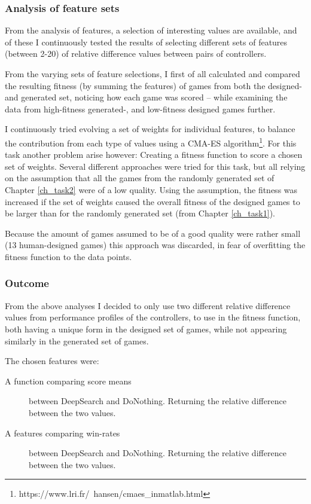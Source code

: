 \documentclass[a4paper,titlepage,final]{report}
\begin{document}
\subsubsection*{Analysis of feature sets}
From the analysis of features, a selection of interesting values are available, and of these I continuously tested the results of  selecting different sets of features (between 2-20) of relative difference values between pairs of controllers.

From the varying sets of feature selections, I first of all calculated and compared the resulting fitness (by summing the features) of games from both the designed- and generated set, noticing how each game was scored -- while examining the data from high-fitness generated-, and low-fitness designed games further.

I continuously tried evolving a set of weights for individual features, to balance the contribution from each type of values using a CMA-ES algorithm\footnote{https://www.lri.fr/~hansen/cmaes\_inmatlab.html}.
For this task another problem arise however: Creating a fitness function to score a chosen set of weights.
Several different approaches were tried for this task, but all relying on the assumption that all the games from the randomly generated set of Chapter \ref{ch_task2} were of a low quality.
Using the assumption, the fitness was increased if the set of weights caused the overall fitness of the designed games to be larger than for the randomly generated set (from Chapter \ref{ch_task1}).

Because the amount of games assumed to be of a good quality were rather small (13 human-designed games) this approach was discarded, in fear of overfitting the fitness function to the data points.


\subsubsection*{Outcome}
From the above analyses I decided to only use two different relative difference values from performance profiles of the controllers, to use in the fitness function, both having a unique form in the designed set of games, while not appearing similarly in the generated set of games.

The chosen features were:
\begin{description}
\item[A function comparing score means] between DeepSearch and DoNothing. Returning the relative difference between the two values.
\item[A features comparing win-rates] between DeepSearch and DoNothing. Returning the relative difference between the two values.
\end{description}
\end{document}
